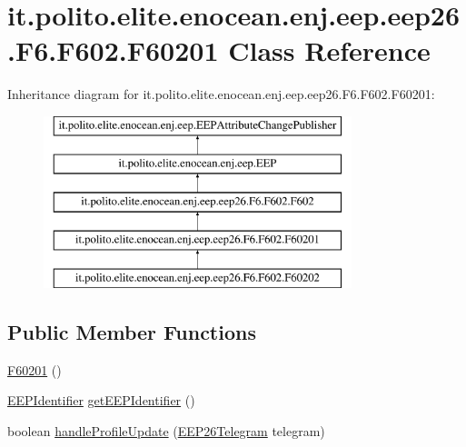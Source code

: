 \hypertarget{classit_1_1polito_1_1elite_1_1enocean_1_1enj_1_1eep_1_1eep26_1_1_f6_1_1_f602_1_1_f60201}{}\section{it.\+polito.\+elite.\+enocean.\+enj.\+eep.\+eep26.\+F6.\+F602.\+F60201 Class Reference}
\label{classit_1_1polito_1_1elite_1_1enocean_1_1enj_1_1eep_1_1eep26_1_1_f6_1_1_f602_1_1_f60201}
Inheritance diagram for it.\+polito.\+elite.\+enocean.\+enj.\+eep.\+eep26.\+F6.\+F602.\+F60201\+:\begin{figure}[H]
\begin{center}
\leavevmode
\includegraphics[height=5.000000cm]{classit_1_1polito_1_1elite_1_1enocean_1_1enj_1_1eep_1_1eep26_1_1_f6_1_1_f602_1_1_f60201}
\end{center}
\end{figure}
\subsection*{Public Member Functions}
\begin{DoxyCompactItemize}
\item 
\hyperlink{classit_1_1polito_1_1elite_1_1enocean_1_1enj_1_1eep_1_1eep26_1_1_f6_1_1_f602_1_1_f60201_aa67b360dda43c0ad97e115946d1d1988}{F60201} ()
\item 
\hyperlink{classit_1_1polito_1_1elite_1_1enocean_1_1enj_1_1eep_1_1_e_e_p_identifier}{E\+E\+P\+Identifier} \hyperlink{classit_1_1polito_1_1elite_1_1enocean_1_1enj_1_1eep_1_1eep26_1_1_f6_1_1_f602_1_1_f60201_a0a73ebc6d5d1279f1d6008e5866f4d40}{get\+E\+E\+P\+Identifier} ()
\item 
boolean \hyperlink{classit_1_1polito_1_1elite_1_1enocean_1_1enj_1_1eep_1_1eep26_1_1_f6_1_1_f602_1_1_f60201_acd55055af25b3eb6b59e1838b52cbe4d}{handle\+Profile\+Update} (\hyperlink{classit_1_1polito_1_1elite_1_1enocean_1_1enj_1_1eep_1_1eep26_1_1telegram_1_1_e_e_p26_telegram}{E\+E\+P26\+Telegram} telegram)
\end{DoxyCompactItemize}
